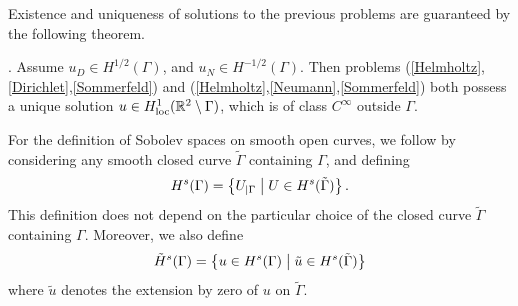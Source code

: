 \documentclass[a4paper]{subfiles}
\begin{document}
\noindent Existence and uniqueness of solutions to the previous problems are guaranteed by the following theorem.
\begin{theorem}
\cite{stephan1984augmented,wendland1990hypersingular,monch1996numerical}. Assume $u_D \in H^{1/2}(\Gamma)$, and $u_N \in H^{-1/2}(\Gamma)$. 
Then problems (\ref{Helmholtz},\ref{Dirichlet},\ref{Sommerfeld}) and (\ref{Helmholtz},\ref{Neumann},\ref{Sommerfeld}) both possess a unique solution 
$u \in H^1_\textup{loc}(\mathbb{R}^2 \setminus \Gamma)$, which is of class $C^{\infty}$ outside $\Gamma$. \end{theorem}
\noindent For the definition of Sobolev spaces on smooth open curves, we follow
\cite{mclean2000strongly} by considering any smooth closed curve $\tilde{\Gamma}$ containing $\Gamma$, and defining 
\[H^s(\Gamma) = \left\{U_{|\Gamma}\mathrel{}\middle|\mathrel{} U \in H^s(\tilde{\Gamma}) \right\}.\]
This definition does not depend on the particular choice of the closed curve $\tilde{\Gamma}$ containing $\Gamma$. Moreover, we also define
\[\tilde{H}^s(\Gamma) = \left\{u \in H^s(\Gamma)\mathrel{}\middle|\mathrel{}\tilde{u} \in H^s(\tilde{\Gamma})\right\}\]
where $\tilde{u}$ denotes the extension by zero of $u$ on $\tilde{\Gamma}$.
\end{document}
